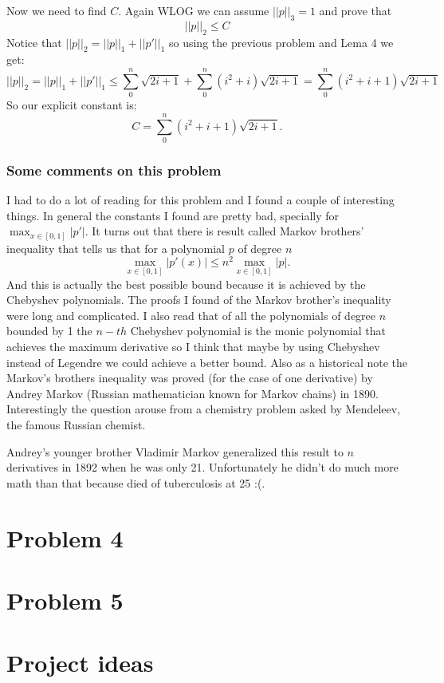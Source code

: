 \documentclass{article}
\begin{document}
Now we need to find $C$. Again WLOG we can assume $||p||_3=1$ and prove that
\[
	||p||_2\leq C
\]
Notice that $||p||_2=||p||_1+ ||p'||_1$ so using the previous problem and Lema 4 we get:
\[
	||p||_2=||p||_1+||p'||_1 \leq \sum_0^n \sqrt{2i+1} + \sum_0^n (i^2+i)\sqrt{2i+1} = \sum_0^n (i^2+i+1)\sqrt{2i+1}
\]
So our explicit constant is:
\[
	C=\sum_0^n (i^2+i+1)\sqrt{2i+1}.
\]
\subsubsection*{Some comments on this problem}
I had to do a lot of reading for this problem and I found a
couple of interesting things. In general the constants I found are pretty bad,
specially for $\max_{x\in[0,1]}|p'|$. It turns out that there is result called
Markov brothers' inequality that tells us that for a polynomial $p$ of degree
$n$
\[
\max_{x\in[0,1]}|p'(x)|\leq n^2 \max_{x\in[0,1]}|p|.
\]
And this is actually the best possible bound because it is achieved by the
Chebyshev polynomials. The proofs I found of the Markov brother's inequality
were long and complicated. I also read that of all the polynomials of degree
$n$ bounded by 1 the $n-th$ Chebyshev polynomial is the monic polynomial that
achieves the maximum derivative so I think that maybe by using Chebyshev
instead of Legendre we could achieve a better bound. Also as a historical note
the Markov's brothers inequality was proved (for the case of one derivative) by
Andrey Markov (Russian mathematician known for Markov chains) in 1890.
Interestingly the question arouse from a chemistry problem asked by Mendeleev,
the famous Russian chemist.

Andrey's younger brother Vladimir Markov generalized this result to $n$
derivatives in 1892 when he was only 21. Unfortunately he didn't do much more
math than that because died of tuberculosis at 25 :(.
\section*{Problem 4}
\section*{Problem 5}
\section*{Project ideas}
\end{document}
